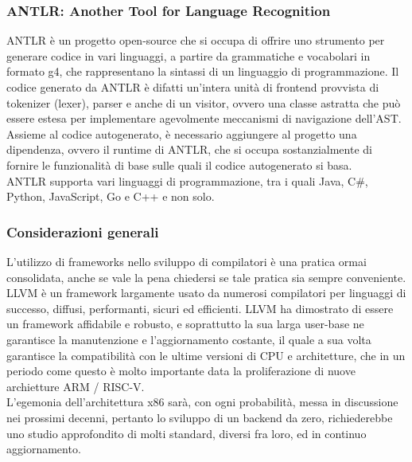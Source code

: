 \subsubsection{ANTLR: Another Tool for Language Recognition}
ANTLR è un progetto open-source che si occupa di offrire uno strumento per generare codice in vari linguaggi,
a partire da grammatiche e vocabolari in formato g4, che rappresentano la sintassi di un linguaggio di programmazione.
Il codice generato da ANTLR è difatti un'intera unità di frontend provvista di tokenizer (lexer), parser e anche 
di un visitor, ovvero una classe astratta che può essere estesa per implementare agevolmente meccanismi di 
navigazione dell'AST. \\ 

Assieme al codice autogenerato, è necessario aggiungere al progetto una dipendenza, ovvero il runtime di ANTLR,
che si occupa sostanzialmente di fornire le funzionalità di base sulle quali il codice autogenerato si basa. \\

ANTLR supporta vari linguaggi di programmazione, tra i quali Java, C\#, Python, JavaScript, Go e C++ e non solo.

\subsubsection{Considerazioni generali}
L'utilizzo di frameworks nello sviluppo di compilatori è una pratica ormai consolidata, anche se vale 
la pena chiedersi se tale pratica sia sempre conveniente. \\ 

LLVM è un framework largamente usato 
da numerosi compilatori per linguaggi di successo, diffusi, performanti, sicuri ed efficienti. LLVM ha 
dimostrato di essere un framework affidabile e robusto, e soprattutto la sua larga user-base ne garantisce
la manutenzione e l'aggiornamento costante, il quale a sua volta garantisce la compatibilità con le ultime
versioni di CPU e architetture, che in un periodo come questo è molto importante data la proliferazione di 
nuove archietture ARM / RISC-V. \\

L'egemonia dell'architettura x86 sarà, con ogni
probabilità, messa in discussione nei prossimi decenni, pertanto lo sviluppo di un backend da zero, richiederebbe
uno studio approfondito di molti standard, diversi fra loro, ed in continuo aggiornamento.  \\ 

